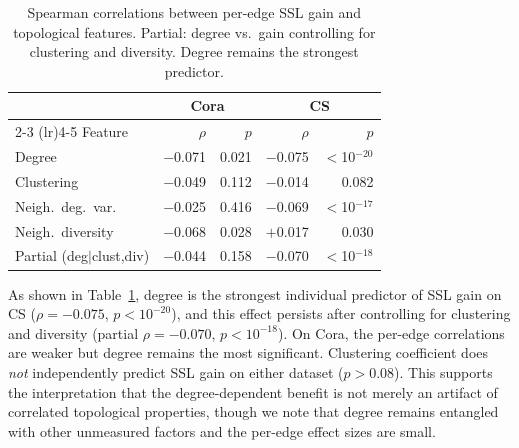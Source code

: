 \begin{table}[t]
\centering
\small
\caption{Spearman correlations between per-edge SSL gain and topological features. Partial: degree vs.\ gain controlling for clustering and diversity. Degree remains the strongest predictor.}
\label{tab:partial}
\begin{tabular}{l rr rr}
\toprule
& \multicolumn{2}{c}{Cora} & \multicolumn{2}{c}{CS} \\
\cmidrule(lr){2-3} \cmidrule(lr){4-5}
Feature & $\rho$ & $p$ & $\rho$ & $p$ \\
\midrule
Degree & $-$0.071 & 0.021 & $-$0.075 & $<$10$^{-20}$ \\
Clustering & $-$0.049 & 0.112 & $-$0.014 & 0.082 \\
Neigh.\ deg.\ var. & $-$0.025 & 0.416 & $-$0.069 & $<$10$^{-17}$ \\
Neigh.\ diversity & $-$0.068 & 0.028 & $+$0.017 & 0.030 \\
\midrule
Partial (deg$|$clust,div) & $-$0.044 & 0.158 & $-$0.070 & $<$10$^{-18}$ \\
\bottomrule
\end{tabular}
\end{table}

As shown in Table~\ref{tab:partial}, degree is the strongest individual predictor of SSL gain on CS ($\rho = -0.075$, $p < 10^{-20}$), and this effect persists after controlling for clustering and diversity (partial $\rho = -0.070$, $p < 10^{-18}$). On Cora, the per-edge correlations are weaker but degree remains the most significant. Clustering coefficient does \emph{not} independently predict SSL gain on either dataset ($p > 0.08$). This supports the interpretation that the degree-dependent benefit is not merely an artifact of correlated topological properties, though we note that degree remains entangled with other unmeasured factors and the per-edge effect sizes are small.
